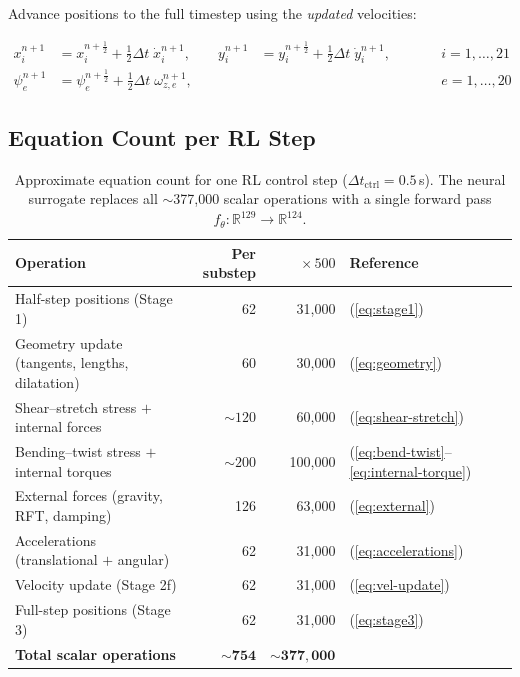 \documentclass[11pt]{article}
\newcommand{\Real}{\mathbb{R}}
\begin{document}
Advance positions to the full timestep using the \emph{updated} velocities:

\begin{subequations}
\label{eq:stage3}
\begin{alignat}{3}
  x_i^{n+1} &= x_i^{n+\frac{1}{2}} + \tfrac{1}{2}\Delta t\;\dot{x}_i^{n+1},
  &\quad
  y_i^{n+1} &= y_i^{n+\frac{1}{2}} + \tfrac{1}{2}\Delta t\;\dot{y}_i^{n+1},
  &\qquad& i = 1, \ldots, 21
  \label{eq:stage3-pos} \\[4pt]
  \psi_e^{n+1} &= \psi_e^{n+\frac{1}{2}} + \tfrac{1}{2}\Delta t\;\omega_{z,e}^{n+1},
  &&
  &\qquad& e = 1, \ldots, 20
  \label{eq:stage3-yaw}
\end{alignat}
\end{subequations}

\subsection{Equation Count per RL Step}
\label{sec:equation-count}

\begin{table}[H]
  \centering
  \renewcommand{\arraystretch}{1.3}
  \begin{tabular}{lrrl}
    \toprule
    \textbf{Operation} & \textbf{Per substep} & \textbf{$\times\, 500$} & \textbf{Reference} \\
    \midrule
    Half-step positions (Stage 1)
      & 62 & 31{,}000 & (\ref{eq:stage1}) \\
    Geometry update (tangents, lengths, dilatation)
      & 60 & 30{,}000 & (\ref{eq:geometry}) \\
    Shear--stretch stress $+$ internal forces
      & $\sim\!120$ & 60{,}000 & (\ref{eq:shear-stretch}) \\
    Bending--twist stress $+$ internal torques
      & $\sim\!200$ & 100{,}000 & (\ref{eq:bend-twist}--\ref{eq:internal-torque}) \\
    External forces (gravity, RFT, damping)
      & 126 & 63{,}000 & (\ref{eq:external}) \\
    Accelerations (translational $+$ angular)
      & 62 & 31{,}000 & (\ref{eq:accelerations}) \\
    Velocity update (Stage 2f)
      & 62 & 31{,}000 & (\ref{eq:vel-update}) \\
    Full-step positions (Stage 3)
      & 62 & 31{,}000 & (\ref{eq:stage3}) \\
    \midrule
    \textbf{Total scalar operations}
      & $\sim\!\mathbf{754}$ & $\sim\!\mathbf{377{,}000}$ & \\
    \bottomrule
  \end{tabular}
  \caption{Approximate equation count for one RL control step ($\Delta t_{\text{ctrl}} = 0.5$\,s).
    The neural surrogate replaces all $\sim$377{,}000 scalar operations with a single forward pass
    $f_\theta\colon \Real^{129} \to \Real^{124}$.}
  \label{tab:equation-count}
\end{table}
\end{document}
